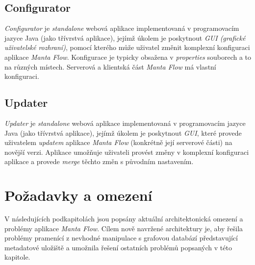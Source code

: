\subsection{Configurator}
\textit{Configurator} je \textit{standalone} webová aplikace implementovaná v programovacím jazyce Java (jako třívrstvá aplikace), jejímž úkolem je poskytnout \textit{GUI (grafické uživatelské rozhraní)}, pomocí kterého může uživatel změnit komplexní konfiguraci aplikace \textit{Manta Flow}. Konfigurace je typicky obsažena v \textit{properties} souborech a to na různých místech. Serverová a klientská část \textit{Manta Flow} má vlastní konfiguraci. \cite{Molitor18}

\subsection{Updater}
\textit{Updater} je \textit{standalone} webová aplikace implementovaná v programovacím jazyce Java (jako třívrstvá aplikace), jejímž úkolem je poskytnout \textit{GUI}, které provede uživatelem \textit{updatem} aplikace \textit{Manta Flow} (konkrétně její serverové části) na novější verzi. Aplikace umožňuje uživateli provést změny v komplexní konfiguraci aplikace a provede \textit{merge} těchto změn s původním nastavením. \cite{Gondek16}

\section{Požadavky a omezení}
\label{sec:ana_problems}
V následujících podkapitolách jsou popsány aktuální architektonická omezení a problémy aplikace \textit{Manta Flow}. Cílem nově navržené architektury je, aby řešila problémy pramenící z nevhodné manipulace s grafovou databází představující metadatové uložiště a umožnila řešení ostatních problémů popsaných v této kapitole.

